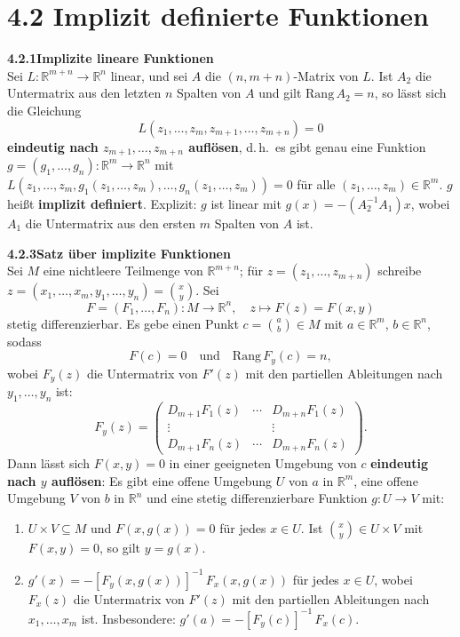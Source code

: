 \documentclass[a4paper,12pt]{article}
\newcommand{\gentry}[3]{%
  \noindent\textbf{#1\quad #2}\nopagebreak\\[0.2em]
  #3\par\smallskip
}
\begin{document}
\section*{4.2 \quad Implizit definierte Funktionen}

\gentry{4.2.1}{Implizite lineare Funktionen}{%
  Sei $L: \mathbb{R}^{m+n} \to \mathbb{R}^n$ linear, und sei $A$ die $(n, m+n)$-Matrix von $L$.
  Ist $A_2$ die Untermatrix aus den letzten $n$ Spalten von $A$ und gilt $\mathrm{Rang}\,A_2 = n$,
  so lässt sich die Gleichung
  \[
    L(z_1, \ldots, z_m, z_{m+1}, \ldots, z_{m+n}) = 0
  \]
  \textbf{eindeutig nach $z_{m+1}, \ldots, z_{m+n}$ auflösen}, d.\,h.\ es gibt genau eine
  Funktion $g = (g_1, \ldots, g_n): \mathbb{R}^m \to \mathbb{R}^n$ mit
  $L(z_1, \ldots, z_m, g_1(z_1, \ldots, z_m), \ldots, g_n(z_1, \ldots, z_m)) = 0$
  für alle $(z_1, \ldots, z_m) \in \mathbb{R}^m$. $g$ heißt \textbf{implizit definiert}.
  Explizit: $g$ ist linear mit $g(x) = -(A_2^{-1} A_1) x$, wobei $A_1$ die Untermatrix aus
  den ersten $m$ Spalten von $A$ ist.
}

\gentry{4.2.3}{Satz über implizite Funktionen}{%
  Sei $M$ eine nichtleere Teilmenge von $\mathbb{R}^{m+n}$; für $z = (z_1, \ldots, z_{m+n})$
  schreibe $z = (x_1, \ldots, x_m, y_1, \ldots, y_n) = \binom{x}{y}$. Sei
  \[
    F = (F_1, \ldots, F_n): M \to \mathbb{R}^n, \quad z \mapsto F(z) = F(x, y)
  \]
  stetig differenzierbar. Es gebe einen Punkt $c = \binom{a}{b} \in M$ mit $a \in \mathbb{R}^m$,
  $b \in \mathbb{R}^n$, sodass
  \[
    F(c) = 0 \quad \text{und} \quad \mathrm{Rang}\,F_y(c) = n,
  \]
  wobei $F_y(z)$ die Untermatrix von $F'(z)$ mit den partiellen Ableitungen nach
  $y_1, \ldots, y_n$ ist:
  \[
    F_y(z) = \begin{pmatrix}
      D_{m+1} F_1(z) & \cdots & D_{m+n} F_1(z) \\
      \vdots & & \vdots \\
      D_{m+1} F_n(z) & \cdots & D_{m+n} F_n(z)
    \end{pmatrix}.
  \]
  Dann lässt sich $F(x, y) = 0$ in einer geeigneten Umgebung von $c$
  \textbf{eindeutig nach $y$ auflösen}: Es gibt eine offene Umgebung $U$ von $a$ in $\mathbb{R}^m$,
  eine offene Umgebung $V$ von $b$ in $\mathbb{R}^n$ und eine stetig differenzierbare
  Funktion $g: U \to V$ mit:
  \begin{enumerate}[label=(\roman*),topsep=2pt,itemsep=1pt]
    \item $U \times V \subseteq M$ und $F(x, g(x)) = 0$ für jedes $x \in U$.
          Ist $\binom{x}{y} \in U \times V$ mit $F(x, y) = 0$, so gilt $y = g(x)$.
    \item $g'(x) = -[F_y(x, g(x))]^{-1}\,F_x(x, g(x))$ für jedes $x \in U$,
          wobei $F_x(z)$ die Untermatrix von $F'(z)$ mit den partiellen Ableitungen nach
          $x_1, \ldots, x_m$ ist. Insbesondere: $g'(a) = -[F_y(c)]^{-1}\,F_x(c)$.
  \end{enumerate}
}
\end{document}
